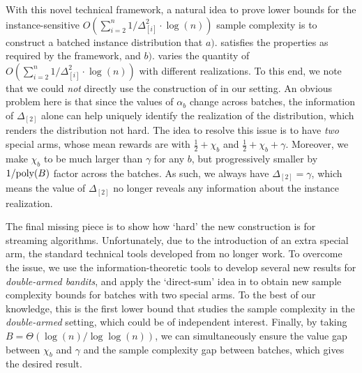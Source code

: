 	With this novel technical framework, a natural idea to prove lower bounds for the instance-sensitive $O(\sum_{i=2}^{n}1/\Delta^2_{[i]} \cdot \log(n))$ sample complexity is to construct a batched instance distribution that $a).$ satisfies the properties as required by the framework, and $b).$ varies the quantity of $O(\sum_{i=2}^{n}1/\Delta^2_{[i]} \cdot \log(n))$ with different realizations.
	To this end, we note that we could \emph{not} directly use the construction of \cite{AW23BestArm} in our setting. 
	An obvious problem here is that since the values of $\alpha_{b}$ change across batches, the information of $\Delta_{[2]}$ alone can help uniquely identify the realization of the distribution, which renders the distribution not hard. The idea to resolve this issue is to have \emph{two} special arms, whose mean rewards are with $\frac{1}{2}+\chi_{b}$ and $\frac{1}{2}+\chi_{b}+\gamma$. Moreover, we make $\chi_{b}$ to be much larger than $\gamma$ for any $b$, but progressively smaller by $1/\mbox{\rm poly}(B)$ factor across the batches. As such, we always have $\Delta_{[2]}=\gamma$, which means the value of $\Delta_{[2]}$ no longer reveals any information about the instance realization.
	
	The final missing piece is to show how `hard' the new construction is for streaming algorithms. Unfortunately, due to the introduction of an extra special arm, the standard technical tools developed from \cite{AgarwalKP22,AWneurips22,AW23BestArm} no longer work. To overcome the issue, we use the information-theoretic tools to develop several new results for \emph{double-armed bandits}, and apply the `direct-sum' idea in \cite{AWneurips22,AW23BestArm} to obtain new sample complexity bounds for batches with two special arms. To the best of our knowledge, this is the first lower bound that studies the sample complexity in the \emph{double-armed} setting, which could be of independent interest. Finally, by taking $B=\Theta(\log(n)/\log\log(n))$, we can simultaneously ensure the value gap between $\chi_{b}$ and $\gamma$ and the sample complexity gap between batches, which gives the desired result.
	
